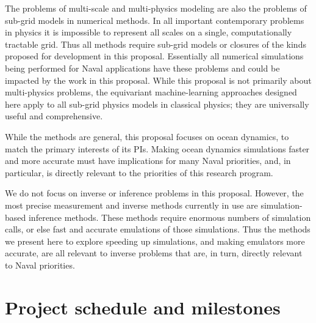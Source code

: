 \documentclass[11pt]{article}
\begin{document}
The problems of multi-scale and multi-physics modeling are also the problems of sub-grid models in numerical methods.
In all important contemporary problems in physics it is impossible to represent all scales on a single, computationally tractable grid.
Thus all methods require sub-grid models or closures of the kinds proposed for development in this proposal.
Essentially all numerical simulations being performed for Naval applications have these problems and could be impacted by the work in this proposal.
While this proposal is not primarily about multi-physics problems, the equivariant machine-learning approaches designed here apply to all sub-grid physics models in classical physics; they are universally useful and comprehensive.

While the methods are general, this proposal focuses on ocean dynamics, to match the primary interests of its PIs.
Making ocean dynamics simulations faster and more accurate must have implications for many Naval priorities,
and, in particular, is directly relevant to the priorities of this research program.

We do not focus on inverse or inference problems in this proposal.
However, the most precise measurement and inverse methods currently in use are simulation-based inference methods.
These methods require enormous numbers of simulation calls, or else fast and accurate emulations of those simulations.
Thus the methods we present here to explore speeding up simulations, and making emulators more accurate, are all relevant to inverse problems that are, in turn, directly relevant to Naval priorities.

\section{Project schedule and milestones}\label{sec:deliverables}
\end{document}
